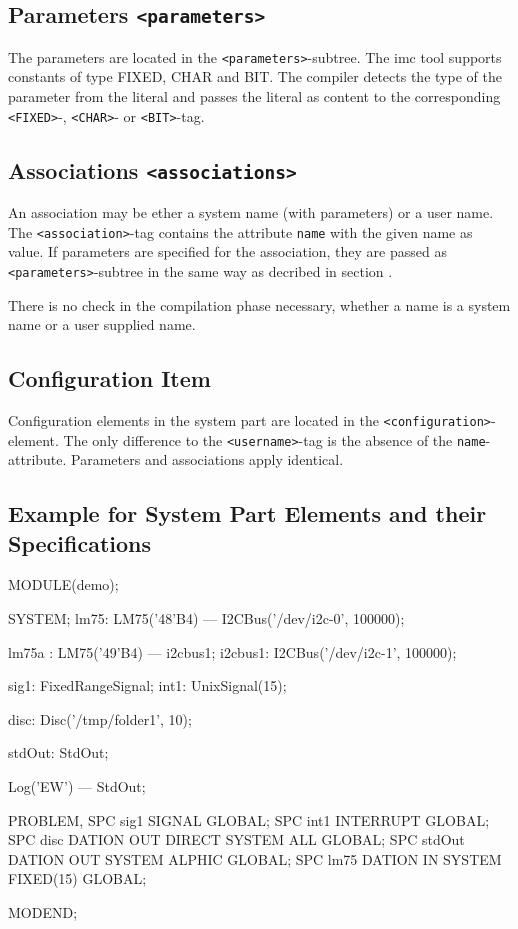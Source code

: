 \subsection{Parameters \texttt{<parameters>}}
The parameters are located in the \verb|<parameters>|-subtree.
The imc tool supports constants of type FIXED, CHAR and BIT.
The compiler detects  the type of the parameter
from the literal and passes the literal as content to the corresponding
\verb|<FIXED>|-, \verb|<CHAR>|- or \verb|<BIT>|-tag.

\subsection{Associations \texttt{<associations>}}
An association may be ether a system name (with parameters) or a user name.
The  \verb|<association>|-tag contains the attribute \verb|name| with the 
given name as value. If parameters are specified for the association,
they are passed as \verb|<parameters>|-subtree in the same way as decribed 
in section \label{sec_system_names}.

There is no check in the compilation phase necessary,
whether a name is a system name
or a user supplied name.


\subsection{Configuration Item}
Configuration elements in the system part are located in the
\verb|<configuration>|-element. 
The only difference to the \verb|<username>|-tag is the absence of the 
\verb|name|-attribute. Parameters and associations apply identical.

\subsection{Example for System Part Elements and their Specifications}
\begin{PEARLCode}
MODULE(demo);

SYSTEM;
lm75: LM75('48'B4) --- I2CBus('/dev/i2c-0', 100000);

lm75a : LM75('49'B4) --- i2cbus1;
i2cbus1: I2CBus('/dev/i2c-1', 100000);

sig1: FixedRangeSignal;
int1: UnixSignal(15);

disc: Disc('/tmp/folder1', 10);

stdOut: StdOut;

Log('EW') --- StdOut;

PROBLEM,
SPC sig1 SIGNAL GLOBAL;
SPC int1 INTERRUPT GLOBAL;
SPC disc DATION OUT DIRECT SYSTEM ALL GLOBAL;
SPC stdOut DATION OUT SYSTEM ALPHIC GLOBAL;
SPC lm75 DATION IN SYSTEM FIXED(15) GLOBAL;

MODEND;
\end{PEARLCode}

